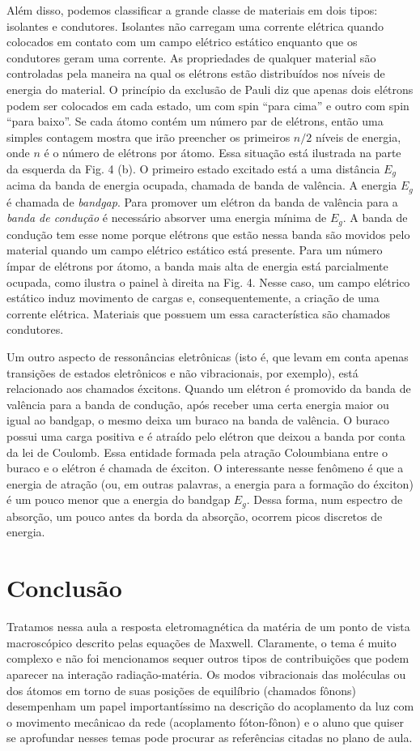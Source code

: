 \documentclass{article}
\begin{document}
Além disso, podemos classificar a grande classe de materiais em dois tipos: isolantes e condutores. Isolantes não carregam uma corrente elétrica quando colocados em contato com um campo elétrico estático enquanto que os condutores geram uma corrente. As propriedades de qualquer material são controladas pela maneira na qual os elétrons estão distribuídos nos níveis de energia do material. O princípio da exclusão de Pauli diz que apenas dois elétrons podem ser colocados em cada estado, um com spin ``para cima'' e outro com spin ``para baixo''. Se cada átomo contém um número par de elétrons, então uma simples contagem mostra que irão preencher os primeiros $n/2$ níveis de energia, onde $n$ é o número de elétrons por átomo. Essa situação está ilustrada na parte da esquerda da Fig. 4 (b). O primeiro estado excitado está a uma distância $E_g$ acima da banda de energia ocupada, chamada de banda de valência. A energia $E_g$ é chamada de \textit{bandgap}. Para promover um elétron da banda de valência para a \textit{banda de condução} é necessário absorver uma energia mínima de $E_g$. A banda de condução tem esse nome porque elétrons que estão nessa banda são movidos pelo material quando um campo elétrico estático está presente. Para um número ímpar de elétrons por átomo, a banda mais alta de energia está parcialmente ocupada, como ilustra o painel à direita na Fig. 4. Nesse caso, um campo elétrico estático induz movimento de cargas e, consequentemente, a criação de uma corrente elétrica. Materiais que possuem um essa característica são chamados condutores.

Um outro aspecto de ressonâncias eletrônicas (isto é, que levam em conta apenas transições de estados eletrônicos e não vibracionais, por exemplo), está relacionado aos chamados éxcitons. Quando um elétron é promovido da banda de valência para a banda de condução, após receber uma certa energia maior ou igual ao bandgap, o mesmo deixa um buraco na banda de valência. O buraco possui uma carga positiva e é atraído pelo elétron que deixou a banda por conta da lei de Coulomb. Essa entidade formada pela atração Coloumbiana entre o buraco e o elétron é chamada de éxciton. O interessante nesse fenômeno é que a energia de atração (ou, em outras palavras, a energia para a formação do éxciton) é um pouco menor que a energia do bandgap $E_g$. Dessa forma, num espectro de absorção, um pouco antes da borda da absorção, ocorrem picos discretos de energia. 

\section{Conclusão}

Tratamos nessa aula a resposta eletromagnética da matéria de um ponto de vista macroscópico descrito pelas equações de Maxwell. Claramente, o tema é muito complexo e não foi mencionamos sequer outros tipos de contribuições que podem aparecer na interação radiação-matéria. Os modos vibracionais das moléculas ou dos átomos em torno de suas posições de equilíbrio (chamados fônons) desempenham um papel importantíssimo na descrição do acoplamento da luz com o movimento mecânicao da rede (acoplamento fóton-fônon) e o aluno que quiser se aprofundar nesses temas pode procurar as referências citadas no plano de aula.
\end{document}
